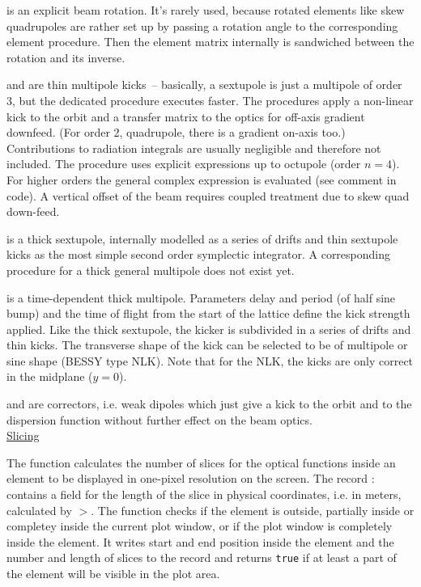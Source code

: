 \documentclass[12pt]{article}
\newcommand\code[1]{{\tt #1}}
\newcommand{\unico}[1]{{\color{burntorange}\code{#1}}}
\newcommand{\prcod}[2]{\opauni{#1}$>$\unico{#2}}
\newcommand{\vrcod}[2]{\opauni{#1}:\unico{#2}}
\newcommand{\opauni}[1]{\colorbox{orange!30}{{\color{black}\code{#1}}}}
\begin{document}
\unico{Rotation} is an explicit beam rotation. It's rarely used, because rotated elements like skew quadrupoles are rather set up by passing a rotation angle to the corresponding element procedure. Then the element matrix internally is sandwiched between the rotation and its inverse.

\unico{ThinSextupole} and \unico{Multipole} are thin multipole kicks~-- basically, a sextupole is just a multipole of order 3, but the dedicated procedure executes faster. The procedures apply a non-linear kick to the orbit and a transfer matrix to the optics for off-axis gradient downfeed. (For order 2, quadrupole, there is a gradient on-axis too.) Contributions to radiation integrals are usually negligible and therefore not included. The \unico{Multipole} procedure uses explicit expressions up to octupole (order $n=4$). For higher orders the general complex expression is evaluated (see comment in code). A vertical offset of the beam requires coupled treatment due to skew quad down-feed.

\unico{Sextupole} is a thick sextupole, internally modelled as a series of drifts and thin sextupole kicks as the most simple second order symplectic integrator. A corresponding procedure for a thick general multipole does not exist yet.

\unico{Kicker} is a time-dependent thick multipole. Parameters delay and period (of half sine bump) and the time of flight from the start of the lattice define the kick strength applied. Like the thick sextupole, the kicker is subdivided in a series of drifts and thin kicks. The transverse shape of the kick can be selected to be of multipole or  sine shape (BESSY type NLK). Note that for the NLK, the kicks are only correct in the midplane ($y=0$).

\unico{HCorr} and \unico{VCorr} are correctors, i.e. weak dipoles which just give a kick to the orbit and to the dispersion function without further effect on the beam optics.\\

\underline{Slicing}

The \unico{SliceSet} function calculates the number of slices for the optical functions inside an element to be displayed in one-pixel resolution on the screen. The record \vrcod{globlib}{CurvePlot} contains a field \unico{slice} for the length of the slice in physical coordinates, i.e. in meters, calculated by \prcod{opalinop}{Zoom}. The \unico{SliceSet} function checks if the element is outside, partially inside or completey inside the current plot window, or if the plot window is completely inside the element. It writes start and end position inside the element and the number and length of slices to the \unico{CurvePlot} record and returns \code{true} if at least a part of the element will be visible in the plot area.
\end{document}
